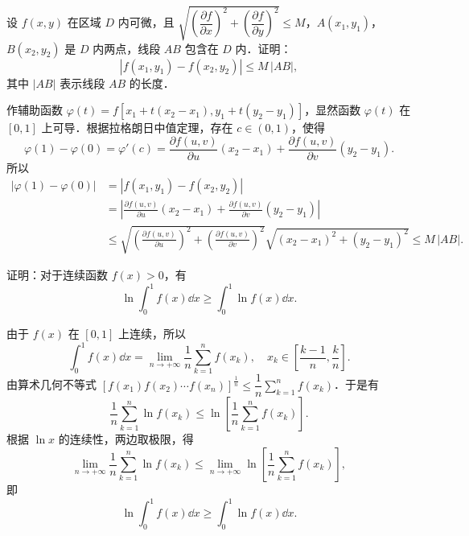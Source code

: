 设 $f(x,y)$ 在区域 $D$ 内可微，且 $\sqrt{\left(\dfrac{\partial f}{\partial x}\right)^{2}+\left(\dfrac{\partial f}{\partial y}\right)^{2}}\le M$，$A(x_{1},y_{1})$，$B(x_{2},y_{2})$ 是 $D$ 内两点，线段 $AB$ 包含在 $D$ 内．证明：
\[
\left|f(x_{1},y_{1})-f(x_{2},y_{2})\right|\le M\,|AB|,
\]
其中 $|AB|$ 表示线段 $AB$ 的长度．
\begin{solution}
作辅助函数 $\varphi(t)=f\left[x_{1}+t(x_{2}-x_{1}),y_{1}+t(y_{2}-y_{1})\right]$，显然函数 $\varphi(t)$ 在 $[0,1]$ 上可导．根据拉格朗日中值定理，存在 $c\in(0,1)$，使得
\[
\varphi(1)-\varphi(0)=\varphi'(c)
=\frac{\partial f(u,v)}{\partial u}(x_{2}-x_{1})+\frac{\partial f(u,v)}{\partial v}(y_{2}-y_{1}).
\]
所以
\begin{align*}
\left|\varphi(1)-\varphi(0)\right|
&=\left|f(x_{1},y_{1})-f(x_{2},y_{2})\right|\\
&=\left|\frac{\partial f(u,v)}{\partial u}(x_{2}-x_{1})+\frac{\partial f(u,v)}{\partial v}(y_{2}-y_{1})\right|\\
&\le\sqrt{\left(\frac{\partial f(u,v)}{\partial u}\right)^{2}+\left(\frac{\partial f(u,v)}{\partial v}\right)^{2}}
\sqrt{(x_{2}-x_{1})^{2}+(y_{2}-y_{1})^{2}}\le M\,|AB|.
\end{align*}
\end{solution}

证明：对于连续函数 $f(x)>0$，有
\[
\ln\int_{0}^{1}f(x)\dd x\ge\int_{0}^{1}\ln f(x)\dd x.
\]
\begin{solution}
由于 $f(x)$ 在 $[0,1]$ 上连续，所以
\[
\int_{0}^{1}f(x)\dd x=\lim_{n\to+\infty}\frac{1}{n}\sum_{k=1}^{n}f(x_{k}),\quad
x_{k}\in\left[\frac{k-1}{n},\frac{k}{n}\right].
\]
由算术几何不等式 $\left[f(x_{1})f(x_{2})\cdots f(x_{n})\right]^{\frac{1}{n}}\le\dfrac{1}{n}\sum\limits_{k=1}^{n}f(x_{k})$．于是有
\[
\frac{1}{n}\sum_{k=1}^{n}\ln f(x_{k})\le\ln\left[\frac{1}{n}\sum_{k=1}^{n}f(x_{k})\right].
\]
根据 $\ln x$ 的连续性，两边取极限，得
\[
\lim_{n\to+\infty}\frac{1}{n}\sum_{k=1}^{n}\ln f(x_{k})
\le\lim_{n\to+\infty}\ln\left[\frac{1}{n}\sum_{k=1}^{n}f(x_{k})\right],
\]
即
\[
\ln\int_{0}^{1}f(x)\dd x\ge\int_{0}^{1}\ln f(x)\dd x.
\]
\end{solution}

